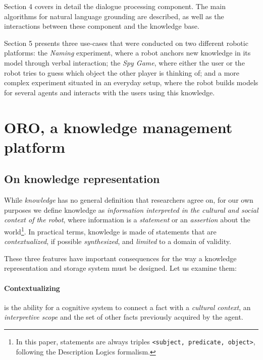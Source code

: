 \documentclass[twocolumn]{svjour3}
\newcommand{\ie}{{\textit{i.e.~}}}
\begin{document}
Section 4 covers in detail the dialogue processing component. The main
algorithms for natural language grounding are described, as well as the
interactions between these component and the knowledge base.

Section 5 presents three use-cases that were conducted on two different
robotic platforms: the \emph{Naming} experiment, where a robot anchors new
knowledge in its model through verbal interaction; the \emph{Spy Game}, where
either the user or the robot tries to guess which object the other player is
thinking of; and a more complex experiment situated in an everyday setup, where
the robot builds models for several agents and interacts with the users using
this knowledge.

\section{ORO, a knowledge management platform} \label{cognitivekernel}

\subsection{On knowledge representation} \label{knowledge_representation}

While \emph{knowledge} has no general definition that researchers agree on, for
our own purposes we define knowledge as \emph{information interpreted in the
cultural and social context of the robot}, where information is a
\emph{statement} or an \emph{assertion} about the world\footnote{In this paper,
statements are always triples \texttt{<subject, predicate, object>}, following
the Description Logics formalism.}. In practical terms, knowledge is made of
statements that are \emph{contextualized}, if possible \emph{synthesized}, and
\emph{limited} to a domain of validity.

These three features have important consequences for the way a knowledge
representation and storage system must be designed. Let us examine them:

\paragraph{Contextualizing} is the ability for a cognitive system to connect a
fact with a \emph{cultural context}, an \emph{interpretive scope} and the set
of other facts previously acquired by the agent.
\end{document}

